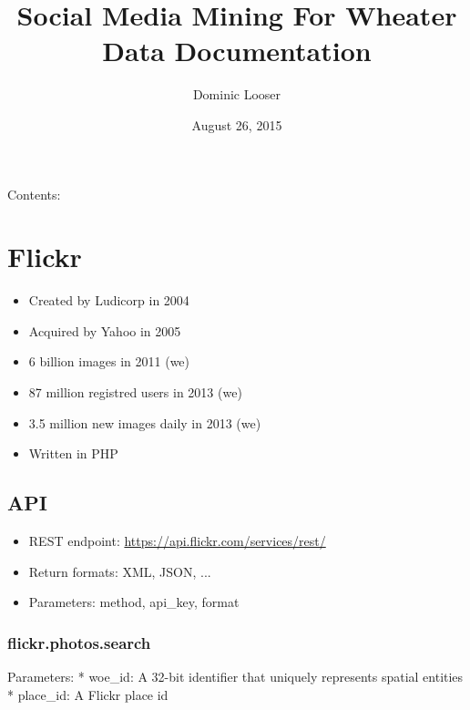 \documentclass[letterpaper,10pt,english]{sphinxmanual}
\title{Social Media Mining For Wheater Data Documentation}
\date{August 26, 2015}
\author{Dominic Looser}
\begin{document}
\maketitle
\tableofcontents
{}\label{index::doc}


Contents:


\chapter{Flickr}
\label{flickr:flickr}\label{flickr::doc}\label{flickr:social-media-mining-for-wheater-data}\begin{itemize}
\item {} 
Created by Ludicorp in 2004

\item {} 
Acquired by Yahoo in 2005

\item {} 
6 billion images in 2011 (we)

\item {} 
87 million registred users in 2013 (we)

\item {} 
3.5 million new images daily in 2013 (we)

\item {} 
Written in PHP

\end{itemize}


\section{API}
\label{flickr:api}\begin{itemize}
\item {} 
REST endpoint: \href{https://api.flickr.com/services/rest/}{https://api.flickr.com/services/rest/}

\item {} 
Return formats: XML, JSON, ...

\item {} 
Parameters: method, api\_key, format

\end{itemize}


\subsection{flickr.photos.search}
\label{flickr:flickr-photos-search}
Parameters:
* woe\_id: A 32-bit identifier that uniquely represents spatial entities
* place\_id: A Flickr place id
\end{document}
